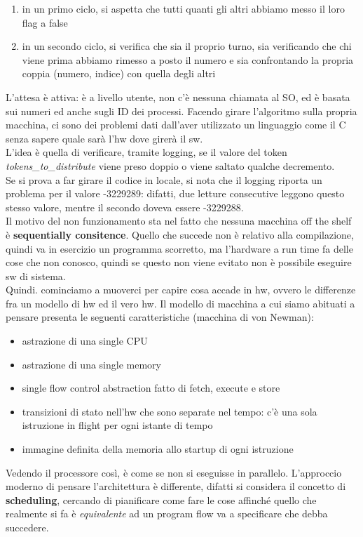 \documentclass[14pt, oneside]{book}
\begin{document}
\begin{enumerate}
\item in un primo ciclo, si aspetta che tutti quanti gli altri abbiamo messo il loro flag a false
\item in un secondo ciclo, si verifica che sia il proprio turno, sia verificando che chi viene prima abbiamo rimesso a posto il numero e sia confrontando la propria coppia (numero, indice) con quella degli altri
\end{enumerate} L'attesa è attiva: è a livello utente, non c'è nessuna chiamata al SO, ed è basata sui numeri ed anche sugli ID dei processi. Facendo girare l'algoritmo sulla propria macchina, ci sono dei problemi dati dall'aver utilizzato un linguaggio come il C senza sapere quale sarà l'hw dove girerà il sw. \\ L'idea è quella di verificare, tramite logging, se il valore del token \textit{tokens\_to\_distribute} viene preso doppio o viene saltato qualche decremento.\\ Se si prova a far girare il codice in locale, si nota che il logging riporta un problema per il valore -3229289: difatti, due letture consecutive leggono questo stesso valore, mentre il secondo doveva essere -3229288.\\ Il motivo del non funzionamento sta nel fatto che nessuna macchina off the shelf è \textbf{sequentially consitence}. Quello che succede non è relativo alla compilazione, quindi va in esercizio un programma scorretto, ma l'hardware a run time fa delle cose che non conosco, quindi se questo non viene evitato non è possibile eseguire sw di sistema.\\ Quindi. cominciamo a muoverci per capire cosa accade in hw, ovvero le differenze fra un modello di hw ed il vero hw. Il modello di macchina a cui siamo abituati a pensare presenta le seguenti caratteristiche (macchina di von Newman):
\begin{itemize}
\item astrazione di una single CPU
\item astrazione di una single memory
\item single flow control abstraction fatto di fetch, execute e store
\item transizioni di stato nell'hw che sono separate nel tempo: c'è una sola istruzione in flight per ogni istante di tempo
\item immagine definita della memoria allo startup di ogni istruzione
\end{itemize}
Vedendo il processore così, è come se non si eseguisse in parallelo. L'approccio moderno di pensare l'architettura è differente, difatti si considera il concetto di \textbf{scheduling}, cercando di pianificare come fare le cose affinché quello che realmente si fa è \textit{equivalente} ad un program flow va a specificare che debba succedere.
\end{document}
